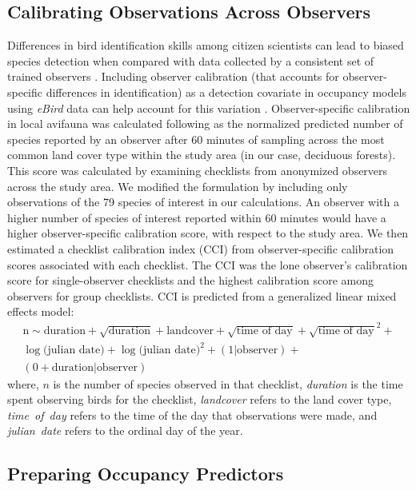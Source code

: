 \subsection*{Calibrating Observations Across Observers}

Differences in bird identification skills among citizen scientists can lead to biased species detection when compared with data collected by a consistent set of trained observers \citep{vanstrien2013}.
Including observer calibration (that accounts for observer-specific differences in identification) as a detection covariate in occupancy models using \textit{eBird} data can help account for this variation \citep{johnston2018}.
Observer-specific calibration in local avifauna was calculated following \textcite{kelling2015a} as the normalized predicted number of species reported by an observer after 60 minutes of sampling across the most common land cover type within the study area (in our case, deciduous forests).
This score was calculated by examining checklists from anonymized observers across the study area.
We modified the \citep{kelling2015a} formulation by including only observations of the 79 species of interest in our calculations.
An observer with a higher number of species of interest reported within 60 minutes would have a higher observer-specific calibration score, with respect to the study area.
We then estimated a checklist calibration index (CCI) from observer-specific calibration scores associated with each checklist.
The CCI was the lone observer's calibration score for single-observer checklists and the highest calibration score among observers for group checklists.
CCI is predicted from a generalized linear mixed effects model:
\begin{multline*}
    \text{n} \sim \text{duration} + \sqrt{\text{duration}} + \text{landcover} + \sqrt{\text{time of day}} + \sqrt{\text{time of day}}^2 + \\ \log({\text{julian date})} + \log({\text{julian date})}^2 + (1 | \text{observer}) + \\(0 + \text{duration} | \text{observer})
\end{multline*}
where, $n$ is the number of species observed in that checklist, \textit{duration} is the time spent observing birds for the checklist, \textit{landcover} refers to the land cover type, \textit{time~of~day} refers to the time of the day that observations were made, and \textit{julian~date} refers to the ordinal day of the year.

\subsection*{Preparing Occupancy Predictors}

